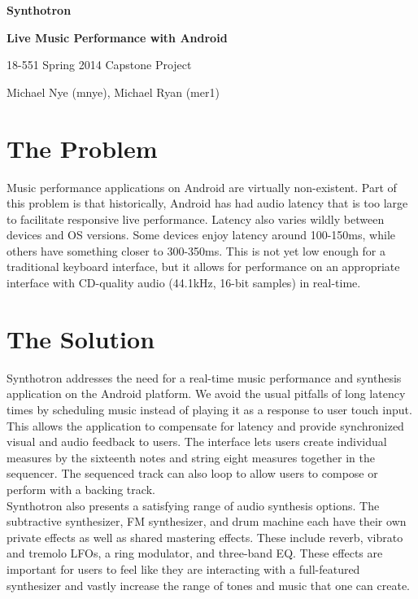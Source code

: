 \documentclass[letterpaper,12pt]{article}
\begin{document}
\begin{center}
    \par{\bf \LARGE Synthotron}
    \par{\bf \large Live Music Performance with Android}
    \par{\large 18-551 Spring 2014 Capstone Project}
    \par{\large Michael Nye (mnye), Michael Ryan (mer1)}
\end{center}


\section{The Problem}

Music performance applications on Android are virtually non-existent. Part of this problem is that historically, Android has had audio latency that is too large to facilitate responsive live performance. Latency also varies wildly between devices and OS versions. Some devices enjoy latency around 100-150ms, while others have something closer to 300-350ms. This is not yet low enough for a traditional keyboard interface, but it allows for performance on an appropriate interface with CD-quality audio (44.1kHz, 16-bit samples) in real-time.

\section{The Solution}
Synthotron addresses the need for a real-time music performance and synthesis application on the Android platform. We avoid the usual pitfalls of long latency times by scheduling music instead of playing it as a response to user touch input. This allows the application to compensate for latency and provide synchronized visual and audio feedback to users. The interface lets users create individual measures by the sixteenth notes and string eight measures together in the sequencer. The sequenced track can also loop to allow users to compose or perform with a backing track.\\

Synthotron also presents a satisfying range of audio synthesis options. The subtractive synthesizer, FM synthesizer, and drum machine each have their own private effects as well as shared mastering effects. These include reverb, vibrato and tremolo LFOs, a ring modulator, and three-band EQ. These effects are important for users to feel like they are interacting with a full-featured synthesizer and vastly increase the range of tones and music that one can create. \\
\end{document}

